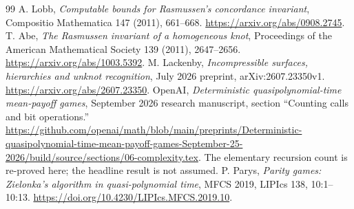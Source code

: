 \documentclass[11pt]{article}
\theoremstyle{definition}
\theoremstyle{remark}
\begin{document}
\begin{thebibliography}{99}
 A. Lobb, \emph{Computable bounds for Rasmussen's concordance invariant}, Compositio Mathematica 147 (2011), 661--668. \url{https://arxiv.org/abs/0908.2745}.
 T. Abe, \emph{The Rasmussen invariant of a homogeneous knot}, Proceedings of the American Mathematical Society 139 (2011), 2647--2656. \url{https://arxiv.org/abs/1003.5392}.
 M. Lackenby, \emph{Incompressible surfaces, hierarchies and unknot recognition}, July 2026 preprint, arXiv:2607.23350v1. \url{https://arxiv.org/abs/2607.23350}.
 OpenAI, \emph{Deterministic quasipolynomial-time mean-payoff games}, September 2026 research manuscript, section ``Counting calls and bit operations.'' \url{https://github.com/openai/math/blob/main/preprints/Deterministic-quasipolynomial-time-mean-payoff-games-September-25-2026/build/source/sections/06-complexity.tex}. The elementary recursion count is re-proved here; the headline result is not assumed.
 P. Parys, \emph{Parity games: Zielonka's algorithm in quasi-polynomial time}, MFCS 2019, LIPIcs 138, 10:1--10:13. \url{https://doi.org/10.4230/LIPIcs.MFCS.2019.10}.
\end{thebibliography}
\endgroup
\end{document}
